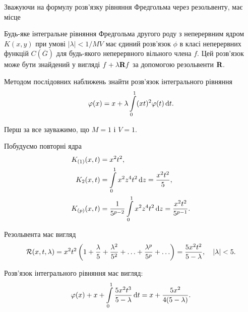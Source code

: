 Зважуючи на формулу розв'язку рівняння Фредгольма через резольвенту, має місце
\begin{theorem}
	Будь-яке інтегральне рівняння Фредгольма другого роду з неперервним ядром $K(x, y)$ при умові $|\lambda| < 1 / MV$ має єдиний розв'язок $\phi$ в класі неперервних функцій $C\left(\overline G\right)$ для будь-якого неперервного вільного члена $f$. Цей розв'язок може бути знайдений у вигляді $f + \lambda \bf{R} f$ за допомогою резольвенти $\bf{R}$.
\end{theorem}

\newpage

\begin{example}
	Методом послідовних наближень знайти розв'язок інтегрального рівняння \begin{equation*}\phi(x) = x + \lambda \Int_0^1 (xt)^2 \phi(t) \diff t.\end{equation*}
\end{example}

\begin{solution}
	Перш за все зауважимо, що $M = 1$ і $V = 1$. \medskip

	Побудуємо повторні ядра 
	\begin{equation*}
		\begin{aligned} 
			K_{(1)}(x, t) &= x^2t^2, \\
			K_2(x, t) &= \Int_0^1 x^2 z^4 t^2 \diff z = \dfrac{x^2t^2}{5}, \\ 
			K_{(p)}(x, t) &= \dfrac{1}{5^{p - 2}} \Int_0^1 x^2 z^4 t^2 \diff z = \dfrac{x^2t^2}{5^{p - 1}}.
		\end{aligned}
	\end{equation*}
		
	Резольвента має вигляд 
	\begin{equation*}
		\cal{R}(x, t, \lambda) = x^2 t^2 \left(1 + \frac{\lambda}{5} + \frac{\lambda^2}{5^2} + \ldots + \frac{\lambda^p}{5^p} + \ldots \right) = \frac{5x^2t^2}{5 - \lambda}, \quad |\lambda| < 5.
	\end{equation*}

	Розв'язок інтегрального рівняння має вигляд: 
	\begin{equation*}
		\phi(x) + x + \Int_0^1 \dfrac{5x^2t^3}{5 - \lambda} \diff t = x + \dfrac{5x^2}{4(5 - \lambda)}.
	\end{equation*}
\end{solution}

